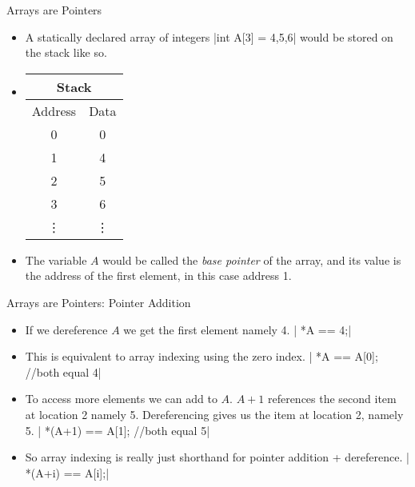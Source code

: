 \documentclass[10pt]{beamer}
\begin{document}
\begin{frame}[fragile]{Arrays are Pointers}
	\begin{itemize}[<+->]
	\item A statically declared array of integers
	|int A[3] = {4,5,6}|
	would be stored on the stack like so.
	\item \begin{tabular}{|c|c|}
		\hline
		\multicolumn{2}{|c|}{Stack}\\
		\hline
		Address & Data\\
		\hline
		0 &	0\\
		\hline
		1 &	4\\
		\hline
		2 &	5\\
		\hline
		3 &	6\\
		\hline
		\vdots & \vdots \\
		\hline
	\end{tabular}
	\item The variable $A$ would be called the {\it base pointer} of the array, and its value is the address of the first element, in this case address 1.
	\end{itemize}
\end{frame}

\begin{frame}[fragile]{Arrays are Pointers: Pointer Addition}
	\begin{itemize}[<+->]
		\item If we dereference $A$ we get the first element namely 4.
		| *A == 4;|
		\item This is equivalent to array indexing using the zero index.
		| *A == A[0]; //both equal 4|
		\item To access more elements we can add to $A$. $A+1$ references the second item at location 2 namely 5. Dereferencing gives us the item at location 2, namely 5.
		| *(A+1) == A[1]; //both equal 5|
		\item So array indexing is really just shorthand for pointer addition + dereference.
		| *(A+i) == A[i];|
	\end{itemize}
\end{frame}
\end{document}
